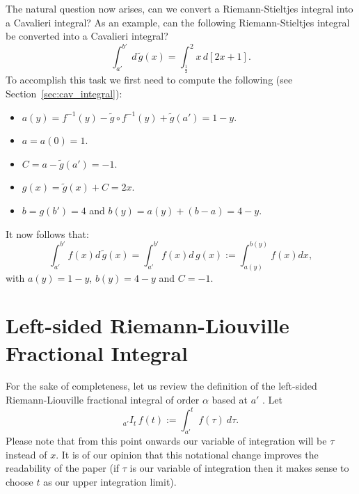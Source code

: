 \documentclass[twoside,reqno,11pt]{fcaa-var} %
\begin{document}

\noindent
The natural question now arises, can we convert a Riemann-Stieltjes integral into a Cavalieri integral? As an example, can the following Riemann-Stieltjes integral be converted into a Cavalieri integral?
\begin{equation}
\int_{a'}^{b'} \,d\,\widetilde{g}(x) = \int_{\frac{1}{2}}^2 x\,d[2x+1].
\end{equation}
To accomplish this task we first need to compute the following (see Section~\ref{sec:cav_integral}):
\begin{itemize}
 \item $a(y) = f^{-1}(y) - \widetilde{g}\circ f^{-1}(y)+ \widetilde{g}(a') = 1-y$.
 \item $a = a(0) = 1$.
 \item $C = a - \widetilde{g}(a') = -1$.
 \item $g(x) = \widetilde{g}(x) + C = 2x$.
 \item $b = g(b') = 4$ and $b(y) = a(y) + (b-a) = 4-y$.
\end{itemize}
It now follows that:
\begin{equation}
\int_{a'}^{b'} f(x)d\,\widetilde{g}(x) = \int_{a'}^{b'} f(x)d\,g(x) := \int_{a(y)}^{b(y)} f(x)dx, 
\end{equation}
with $a(y) = 1-y$, $b(y) = 4-y$ and $C=-1$.

\section{Left-sided Riemann-Liouville Fractional Integral}
\label{sec:ls}
\noindent
For the sake of completeness, let us review the definition of the left-sided Riemann-Liouville fractional integral of order $\alpha$ based at $a'$ \cite{laurent1884}. Let
\begin{equation}
_{a'}I_t\, f(t) := \int_{a'}^t f(\tau)~d\tau.
\end{equation}
Please note that from this point onwards our variable of integration will be $\tau$ instead of $x$. It is of our opinion that this notational change improves the readability of the paper (if $\tau$ is our variable of integration then it makes sense to choose $t$ as our upper integration limit).\\
\end{document}
